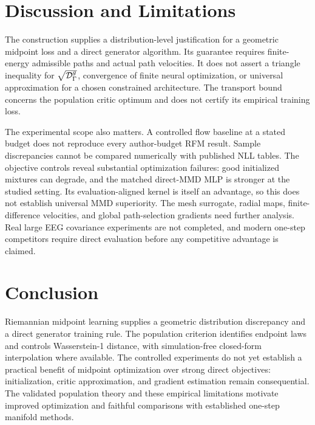 \section{Discussion and Limitations}
The construction supplies a distribution-level justification for a geometric midpoint loss and a direct generator algorithm. Its guarantee requires finite-energy admissible paths and actual path velocities. It does not assert a triangle inequality for $\sqrt{\mathcal D_\Gamma^g}$, convergence of finite neural optimization, or universal approximation for a chosen constrained architecture. The transport bound concerns the population critic optimum and does not certify its empirical training loss.

The experimental scope also matters. A controlled flow baseline at a stated budget does not reproduce every author-budget RFM result. Sample discrepancies cannot be compared numerically with published NLL tables. The objective controls reveal substantial optimization failures: good initialized mixtures can degrade, and the matched direct-MMD MLP is stronger at the studied setting. Its evaluation-aligned kernel is itself an advantage, so this does not establish universal MMD superiority. The mesh surrogate, radial maps, finite-difference velocities, and global path-selection gradients need further analysis. Real large EEG covariance experiments are not completed, and modern one-step competitors require direct evaluation before any competitive advantage is claimed.

\section{Conclusion}
Riemannian midpoint learning supplies a geometric distribution discrepancy and a direct generator training rule. The population criterion identifies endpoint laws and controls Wasserstein-1 distance, with simulation-free closed-form interpolation where available. The controlled experiments do not yet establish a practical benefit of midpoint optimization over strong direct objectives: initialization, critic approximation, and gradient estimation remain consequential. The validated population theory and these empirical limitations motivate improved optimization and faithful comparisons with established one-step manifold methods.
